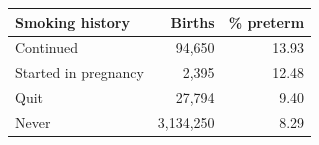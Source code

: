 {\small
\begin{tabular}{lrr}
\toprule
Smoking history & Births & \% preterm \\
\midrule
Continued & 94,650 & 13.93 \\
Started in pregnancy & 2,395 & 12.48 \\
Quit & 27,794 & 9.40 \\
Never & 3,134,250 & 8.29 \\
\bottomrule
\end{tabular}
}
